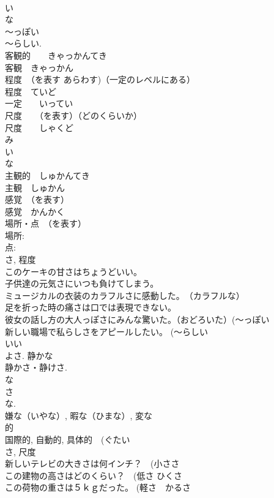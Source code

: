 \documentclass[8pt]{extreport}
\begin{document}
\begin{CJK}{UTF8}{min}
\\	い 
\\	な
\\	～っぽい 
\\	～らしい.
\\	客観的　　きゃっかんてき
\\	客観　きゃっかん
\\	程度　（を表す あらわす)（一定のレベルにある）
\\	程度　ていど
\\	一定　　いってい
\\	尺度　　（を表す）（どのくらいか）
\\	尺度　　しゃくど
\\	み
\\	い 
\\	な
\\	主観的　しゅかんてき
\\	主観　しゅかん　
\\	感覚　（を表す）
\\	感覚　かんかく　
\\	場所・点　（を表す）
\\	場所: 
\\	点: 
\\	さ, 程度 
\\	このケーキの甘さはちょうどいい。
\\	子供達の元気さにいつも負けてしまう。
\\	ミュージカルの衣装のカラフルさに感動した。　（カラフルな）
\\	足を折った時の痛さは口では表現できない。
\\	彼女の話し方の大人っぽさにみんな驚いた。（おどろいた）(～っぽい 
\\	新しい職場で私らしさをアピールしたい。 (～らしい 
\\	いい 
\\	よさ. 静かな 
\\	静かさ・静けさ.
\\	な
\\	さ 
\\	な.
\\	嫌な（いやな）, 暇な（ひまな）, 変な
\\	的　
\\	国際的, 自動的, 具体的　(ぐたい 
\\	さ, 尺度 
\\	新しいテレビの大きさは何インチ？　(小ささ 
\\	この建物の高さはどのくらい？　(低さ ひくさ　
\\	この荷物の重さは５ｋｇだった。 (軽さ　かるさ 

\end{CJK}
\end{document}
